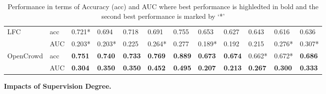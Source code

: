 \begin{table*}[!h]
\begin{tabular}{|l|l|l|l|l|l|l|l|l|l|l|l|}
\multirow{2}{*}{LFC}         & acc     & 0.721*         & 0.694          & 0.718          & 0.691          & 0.755          & 0.653          & 0.627          & 0.643          & 0.616          & 0.636          \\ \cline{2-12} 
                             & AUC   & 0.203*         & 0.203*         & 0.225          & 0.264*         & 0.277          & 0.189*         & 0.192          & 0.215          & 0.276*         & 0.307*         \\ \hline
\multirow{2}{*}{OpenCrowd}   & acc     & \textbf{0.751} & \textbf{0.740} & \textbf{0.733}         & \textbf{0.769} & \textbf{0.889}  & \textbf{0.673} & \textbf{0.674} & 0.662*         & 0.672*         & \textbf{0.686} \\ \cline{2-12} 
                             & AUC  & \textbf{0.304} & \textbf{0.350} & \textbf{0.350} & \textbf{0.452} & \textbf{0.495} & \textbf{0.207} & \textbf{0.213} & \textbf{0.267} & \textbf{0.300} & \textbf{0.333} \\ \hline
\end{tabular}
   \caption{Performance in terms of Accuracy (acc) and AUC where best performance is highledted in bold and the second best performance is marked by `*' }\label{tab:comparision} 
\end{table*}
\label{sec:compres}

\smallskip
\noindent\textbf{Impacts of Supervision Degree.}

